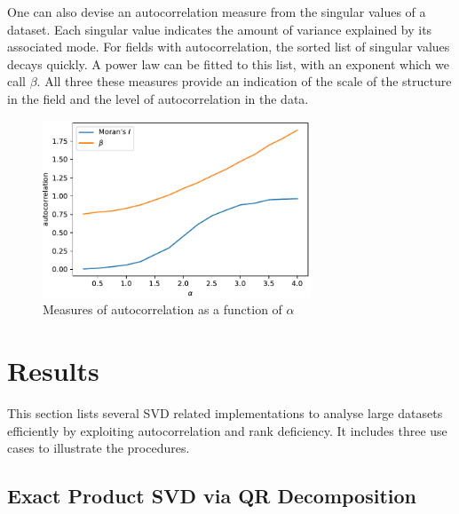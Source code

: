 \documentclass[ijgi,article,submit,moreauthors,pdftex,10pt,a4paper]{Definitions/mdpi}
\begin{document}
One can also devise an autocorrelation measure from the singular values of a dataset. Each singular value indicates the amount of variance explained by its associated mode. For fields with autocorrelation, the sorted list of singular values decays quickly. A power law can be fitted to this list, with an exponent which we call $\beta$. All three these measures provide an indication of the scale of the structure in the field and the level of autocorrelation in the data.

\begin{figure}[H]
\centering
\includegraphics[width=80mm]{Results/plotMoransIAndBeta.pdf}
\caption[Various measures of autocorrelation]{Measures of autocorrelation as a function of $\alpha$}
\label{fig:plotGammaAndMoransIAndBeta}
\end{figure}

\section{Results}


This section lists several SVD related implementations to analyse large datasets efficiently by exploiting autocorrelation and rank deficiency. It includes three use cases to illustrate the procedures.

\subsection{Exact Product SVD via QR Decomposition}
\label{sec:Results/Exact Product SVD via QR Decomposition}
\end{document}
